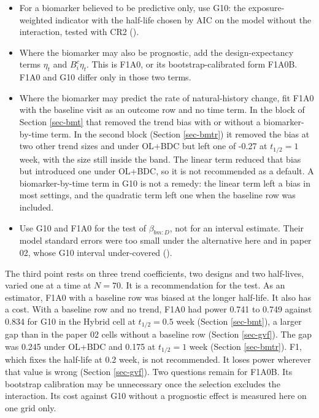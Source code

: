 \documentclass[
  11pt,
]{article}
\providecommand{\tightlist}{%
  \setlength{\itemsep}{0pt}\setlength{\parskip}{0pt}}
\begin{document}
\begin{itemize}
\tightlist
\item
  For a biomarker believed to be predictive only, use G10: the
  exposure-weighted indicator with the half-life chosen by AIC on the
  model without the interaction, tested with CR2
  ().
\item
  Where the biomarker may also be prognostic, add the
  design-expectancy terms \(\eta_t\) and \(B^c_i\eta_t\). This is F1A0,
  or its bootstrap-calibrated form F1A0B. F1A0 and G10 differ only in
  those two terms.
\item
  Where the biomarker may predict the rate of natural-history change,
  fit F1A0 with the baseline visit as an outcome row and no time
  term. In the block of Section \ref{sec-bmt} that removed the trend
  bias with or without a biomarker-by-time term. In the second block
  (Section \ref{sec-bmtr}) it removed the bias at two other trend
  sizes and under OL+BDC but left one of -0.27 at
  \(t_{1/2} = 1\) week, with the size still inside the band. The linear
  term reduced that bias but introduced one under OL+BDC, so it is not
  recommended as a default. A biomarker-by-time term in G10 is not a
  remedy: the linear term left a bias in most settings, and the
  quadratic term left one when the baseline row was included.
\item
  Use G10 and F1A0 for the test of \(\beta_{bm:D}\), not for an
  interval estimate. Their model standard errors were too small under
  the alternative here and in paper 02, whose G10 interval
  under-covered ().
\end{itemize}

The third point rests on three trend coefficients, two designs and
two half-lives, varied one at a time at \(N = 70\). It is a
recommendation for the test. As an estimator, F1A0 with a baseline row
was biased at the longer half-life. It also has a cost. With a
baseline row and no trend, F1A0 had power 0.741 to 0.749 against
0.834 for G10 in the Hybrid cell at \(t_{1/2} = 0.5\) week
(Section \ref{sec-bmt}), a larger gap than in the paper 02 cells
without a baseline row (Section \ref{sec-gvf}). The gap was
0.245 under OL+BDC and 0.175 at
\(t_{1/2} = 1\) week (Section \ref{sec-bmtr}).
F1, which fixes the half-life at 0.2 week, is not recommended. It
loses power wherever that value is wrong (Section \ref{sec-gvf}).
Two questions remain for F1A0B. Its bootstrap calibration may be
unnecessary once the selection excludes the interaction. Its cost
against G10 without a prognostic effect is measured here on one grid
only.
\end{document}
